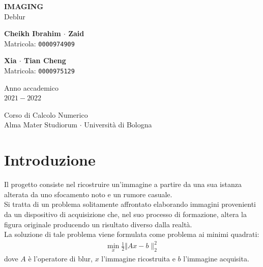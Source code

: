 \documentclass[11pt]{article}
\begin{document}
\graphicspath{ {./img/} }
\begin{titlepage}
    \begin{center}
        \vspace*{1.5cm}
            
        \Huge
        \textbf{IMAGING} \\
        \LARGE
        Deblur
                        
        \vspace{2.0cm}
          
        \begin{minipage}[t]{0.47\textwidth}
        \begin{center}
        	{\large{\bf Cheikh Ibrahim $\cdot$ Zaid}}\\
			{\large Matricola: \texttt{0000974909}}
        \end{center}

		\end{minipage}
		\hfill
		\begin{minipage}[t]{0.47\textwidth}\raggedleft
		\begin{center}
        	{\large{\bf Xia $\cdot$ Tian Cheng}}\\
			{\large Matricola: \texttt{0000975129}}
        \end{center}
		\end{minipage}  
            
        \vspace{6cm}
            
        Anno accademico\\
        $2021 - 2022$
            
        \vspace{0.8cm}
            
            
        \Large
        Corso di Calcolo Numerico\\
        Alma Mater Studiorum $\cdot$ Università di Bologna\\
            
    \end{center}
\end{titlepage}
\pagebreak

\tableofcontents
\newpage

\section{Introduzione}
Il progetto consiste nel ricostruire un'immagine a partire da una sua istanza alterata da uno sfocamento noto e un rumore casuale.\\
Si tratta di un problema solitamente affrontato elaborando immagini provenienti da un dispositivo di acquisizione che, nel suo processo di formazione, altera la figura originale producendo un risultato diverso dalla realtà.\\ 
La soluzione di tale problema viene formulata come problema ai minimi quadrati:
\begin{align*}
    \min\limits_{x} \frac{1}{2} \Vert Ax-b \|_{2}^{2}
\end{align*}
dove $A$ è l'operatore di blur, $x$ l'immagine ricostruita e $b$ l'immagine acquisita.\\
\end{document}
